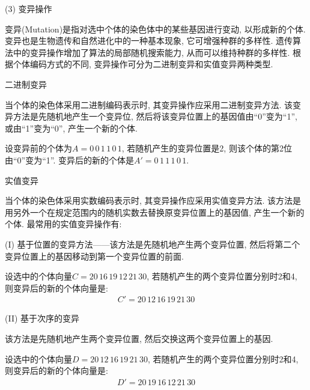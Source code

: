  (3) 变异操作

 变异(Mutation)是指对选中个体的染色体中的某些基因进行变动, 以形成新的个体. 变异也是生物遗传和自然进化中的一种基本现象, 它可增强种群的多样性. 遗传算法中的变异操作增加了算法的局部随机搜索能力, 从而可以维持种群的多样性. 根据个体编码方式的不同, 变异操作可分为二进制变异和实值变异两种类型.

  二进制变异

 当个体的染色体采用二进制编码表示时, 其变异操作应采用二进制变异方法. 该变异方法是先随机地产生一个变异位, 然后将该变异位置上的基因值由“0”变为“1”, 或由“1”变为“0”, 产生一个新的个体.

\begin{example}
设变异前的个体为$A=0\, 0 \, 1\,  1\,  0 \, 1$, 若随机产生的变异位置是2, 则该个体的第2位由“0”变为“1”.
变异后的新的个体是$A'= 0\,  1\,  1\,  1\,  0 \, 1$.
\end{example}

 实值变异

 当个体的染色体采用实数编码表示时, 其变异操作应采用实值变异方法. 该方法是用另外一个在规定范围内的随机实数去替换原变异位置上的基因值, 产生一个新的个体. 最常用的实值变异操作有:

(I) 基于位置的变异方法——该方法是先随机地产生两个变异位置, 然后将第二个变异位置上的基因移动到第一个变异位置的前面.

\begin{example}
设选中的个体向量$C=20\,  16\,  19\,  12\,  21\,  30$, 若随机产生的两个变异位置分别时2和4, 则变异后的新的个体向量是:
\begin{align}
    C'= 20\,  12 \, 16 \, 19\,  21\,  30
\end{align}
\vspace{-0.4cm}
\end{example}

(II) 基于次序的变异

该方法是先随机地产生两个变异位置, 然后交换这两个变异位置上的基因.

\begin{example}
    设选中的个体向量$D=20\,  12 \, 16 \, 19\,  21\,  30$, 若随机产生的两个变异位置分别时2和4, 则变异后的新的个体向量是:
\begin{align}
    D'= 20\,  19\,  16\,  12 \, 21 \, 30
\end{align}
\vspace{-0.4cm}
\end{example}

